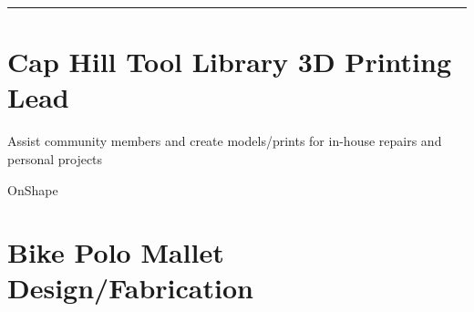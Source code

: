 
\vspace{-1.4ex}
{\hspace{-1.72in}\noindent\color{cblue}{HARDWARE PROJECTS} }

\vspace{-1.6ex}
{\hspace{-1.73in}\noindent\color{dblue}\rule{6.935in}{0.4pt}}

\vspace{2.4ex}


\section{
    \textbf{Cap Hill Tool Library} \newline
    3D Printing Lead
}{}

\begin{detail}
    \BulletItem
    Assist community members and create models/prints for in-house repairs and personal projects
\end{detail}

\begin{subtitle}
    \vspace{-5ex}
    {{}} 
\end{subtitle}

\vspace{-1.5ex}
{
    \vspace{-0.8ex}
    \color{cyan}\small
    {OnShape} %
}

{
    \vspace{-2.5ex}\hspace{1.5in}
    \color{cyan}\small
    {} %
}

\vspace{2.5ex}


\section{
    \textbf{Bike Polo} \newline
    Mallet Design/Fabrication
}{}

